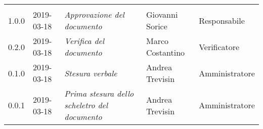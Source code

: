 \newpage 
\section*{}
	\begin{longtable}{C{2cm}|C{2.5cm}|C{4.5cm}|C{2.5cm}|C{3cm}}
	
	 &  &  &  &   \\
	\endhead
		
		1.0.0 & 2019-03-18 & \emph{Approvazione del documento} & Giovanni Sorice & Responsabile \\
		\hline
		
		0.2.0 & 2019-03-18 & \emph{Verifica del documento} & Marco Costantino & Verificatore \\
		\hline

		 0.1.0 & 2019-03-18 & \emph{Stesura verbale} & Andrea Trevisin & Amministratore\\
		\hline
		
		 0.0.1 & 2019-03-18 & \emph{Prima stesura dello scheletro del documento} & Andrea Trevisin & Amministratore\\
	
\end{longtable}


\clearpage